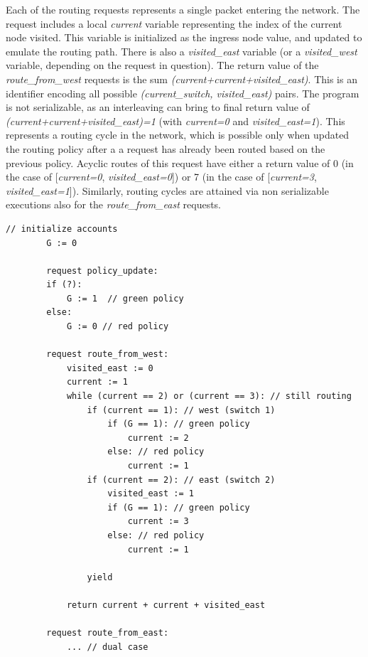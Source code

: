 Each of the routing requests represents a single packet entering the network. The request includes a local \textit{current} variable representing the index of the current node visited. This variable is initialized as the ingress node value, and updated to emulate the routing path. There is also a \textit{visited\_east} variable (or a \textit{visited\_west} variable, depending on the request in question).
%
The return value of the \textit{route\_from\_west} requests is the sum \textit{(current+current+visited\_east)}. This is an identifier encoding all possible \textit{(current\_switch, visited\_east)} pairs.
%
The program is not serializable, as an interleaving can bring to final return value of \textit{(current+current+visited\_east)=1} (with \textit{current=0} and \textit{visited\_east=1}). This represents a routing cycle in the network, which is possible only when updated the routing policy after a a request has already been routed based on the previous policy.
Acyclic routes of this request have either a return value of 0 (in the case of [\textit{current=0}, \textit{visited\_east=0}]) or 7 (in the case of [\textit{current=3}, \textit{visited\_east=1}]).
Similarly, routing cycles are attained via non serializable executions also for the  \textit{route\_from\_east} requests.



\begin{minipage}[t]{1.0\textwidth}
	\begin{lstlisting}[caption={BGP (non serializable --- cycles can appear)},label={lst:BgpNonSerializable}]
	    // initialize accounts
	    G := 0
	    
	    request policy_update:
	    if (?):
	        G := 1  // green policy 
	    else:
	        G := 0 // red policy
			
	    request route_from_west:
	        visited_east := 0
	        current := 1
	        while (current == 2) or (current == 3): // still routing        
	            if (current == 1): // west (switch 1)
	                if (G == 1): // green policy
	                    current := 2
	                else: // red policy
	                    current := 1
	            if (current == 2): // east (switch 2)
	                visited_east := 1
	                if (G == 1): // green policy
	                    current := 3
	                else: // red policy
	                    current := 1
	 
	            yield
			
	        return current + current + visited_east
	        
	    request route_from_east:
	        ... // dual case     		        
		\end{lstlisting}
\end{minipage}






